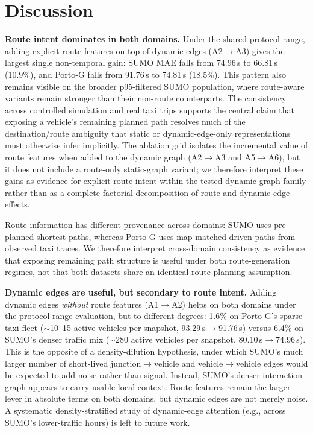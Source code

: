 \documentclass[pdflatex,sn-basic,Numbered]{sn-jnl}%
\begin{document}



\section{Discussion}\label{sec6}

\textbf{Route intent dominates in both domains.} Under the shared protocol range, adding explicit route features on top of dynamic edges (A2$\to$A3) gives the largest single non-temporal gain: SUMO MAE falls from 74.96\,s to 66.81\,s (10.9\%), and Porto-G falls from 91.76\,s to 74.81\,s (18.5\%). This pattern also remains visible on the broader p95-filtered SUMO population, where route-aware variants remain stronger than their non-route counterparts. The consistency across controlled simulation and real taxi trips supports the central claim that exposing a vehicle's remaining planned path resolves much of the destination/route ambiguity that static or dynamic-edge-only representations must otherwise infer implicitly. The ablation grid isolates the incremental value of route features when added to the dynamic graph (A2$\to$A3 and A5$\to$A6), but it does not include a route-only static-graph variant; we therefore interpret these gains as evidence for explicit route intent within the tested dynamic-graph family rather than as a complete factorial decomposition of route and dynamic-edge effects.

Route information has different provenance across domains: SUMO uses pre-planned shortest paths, whereas Porto-G uses map-matched driven paths from observed taxi traces. We therefore interpret cross-domain consistency as evidence that exposing remaining path structure is useful under both route-generation regimes, not that both datasets share an identical route-planning assumption.

\textbf{Dynamic edges are useful, but secondary to route intent.} Adding dynamic edges \emph{without} route features (A1$\to$A2) helps on both domains under the protocol-range evaluation, but to different degrees: 1.6\% on Porto-G's sparse taxi fleet ($\sim$10--15 active vehicles per snapshot, 93.29\,s$\to$91.76\,s) versus 6.4\% on SUMO's denser traffic mix ($\sim$280 active vehicles per snapshot, 80.10\,s$\to$74.96\,s). This is the opposite of a density-dilution hypothesis, under which SUMO's much larger number of short-lived junction$\to$vehicle and vehicle$\to$vehicle edges would be expected to add noise rather than signal. Instead, SUMO's denser interaction graph appears to carry usable local context. Route features remain the larger lever in absolute terms on both domains, but dynamic edges are not merely noise. A systematic density-stratified study of dynamic-edge attention (e.g., across SUMO's lower-traffic hours) is left to future work.
\end{document}

